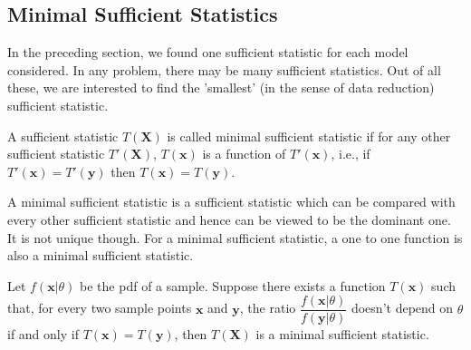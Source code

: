 \documentclass[a4paper,english,12pt]{article}
\newcommand{\bx}{\mathbf{x}}
\newcommand{\by}{\mathbf{y}}
\newcommand{\bX}{\mathbf{X}}
\begin{document}
\subsection{Minimal Sufficient Statistics}
In the preceding section, we found one sufficient statistic for each model considered. In any problem, there may be many sufficient statistics. Out of all these, we are interested to find the 'smallest' (in the sense of data reduction) sufficient statistic.
\begin{defn}
A sufficient statistic $T(\bX)$ is called minimal sufficient statistic if for any other sufficient statistic $T'(\bX)$, $T(\bx)$ is a function of $T'(\bx)$, i.e., if $T'(\bx)=T'(\by)$ then $T(\bx)=T(\by)$.
 \end{defn}
A minimal sufficient statistic is a sufficient statistic which can be compared with every other sufficient statistic and hence can be viewed to be the dominant one. It is not unique though. For a minimal sufficient statistic, a one to one function is also a minimal sufficient statistic. 
\begin{thm} \label {thm:find_mss}
Let $f(\bx|\theta)$ be the pdf of a sample. Suppose there exists a function $T(\bx)$ such that, for every two sample points $\bx$ and $\by$, the ratio $\dfrac{f(\bx|\theta)}{f(\by|\theta)}$ doesn't depend on $\theta$ if and only if $T(\bx) = T(\by)$, then $T(\bX)$ is a minimal sufficient statistic.
\end{thm}
\end{document}
